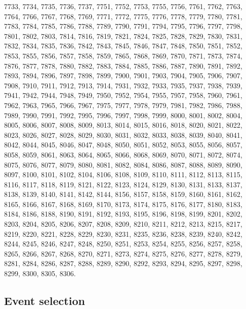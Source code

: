 7733, 7734, 7735, 7736, 7737, 7751, 7752, 7753, 7755, 7756, 7761, 7762, 7763, 7764, 7766, 7767, 7768, 7769, 7771, 7772, 7775, 7776, 7778, 7779, 7780, 7781, 7783, 7784, 7785, 7786, 7788, 7789, 7790, 7791, 7794, 7795, 7796, 7797, 7798, 7801, 7802, 7803, 7814, 7816, 7819, 7821, 7824, 7825, 7828, 7829, 7830, 7831, 7832, 7834, 7835, 7836, 7842, 7843, 7845, 7846, 7847, 7848, 7850, 7851, 7852, 7853, 7855, 7856, 7857, 7858, 7859, 7865, 7868, 7869, 7870, 7871, 7873, 7874, 7876, 7877, 7878, 7880, 7882, 7883, 7884, 7885, 7886, 7887, 7890, 7891, 7892, 7893, 7894, 7896, 7897, 7898, 7899, 7900, 7901, 7903, 7904, 7905, 7906, 7907, 7908, 7910, 7911, 7912, 7913, 7914, 7931, 7932, 7933, 7935, 7937, 7938, 7939, 7941, 7942, 7944, 7948, 7949, 7950, 7952, 7954, 7955, 7957, 7958, 7960, 7961, 7962, 7963, 7965, 7966, 7967, 7975, 7977, 7978, 7979, 7981, 7982, 7986, 7988, 7989, 7990, 7991, 7992, 7995, 7996, 7997, 7998, 7999, 8000, 8001, 8002, 8004, 8005, 8006, 8007, 8008, 8009, 8013, 8014, 8015, 8016, 8018, 8020, 8021, 8022, 8023, 8026, 8027, 8028, 8029, 8030, 8031, 8032, 8033, 8038, 8039, 8040, 8041, 8042, 8044, 8045, 8046, 8047, 8048, 8050, 8051, 8052, 8053, 8055, 8056, 8057, 8058, 8059, 8061, 8063, 8064, 8065, 8066, 8068, 8069, 8070, 8071, 8072, 8074, 8075, 8076, 8077, 8079, 8080, 8081, 8082, 8084, 8086, 8087, 8088, 8089, 8090, 8097, 8100, 8101, 8102, 8104, 8106, 8108, 8109, 8110, 8111, 8112, 8113, 8115, 8116, 8117, 8118, 8119, 8121, 8122, 8123, 8124, 8129, 8130, 8131, 8133, 8137, 8138, 8139, 8140, 8141, 8142, 8144, 8156, 8157, 8158, 8159, 8160, 8161, 8162, 8165, 8166, 8167, 8168, 8169, 8170, 8173, 8174, 8175, 8176, 8177, 8180, 8183, 8184, 8186, 8188, 8190, 8191, 8192, 8193, 8195, 8196, 8198, 8199, 8201, 8202, 8203, 8204, 8205, 8206, 8207, 8208, 8209, 8210, 8211, 8212, 8213, 8215, 8217, 8219, 8220, 8221, 8228, 8229, 8230, 8231, 8235, 8236, 8238, 8239, 8240, 8242, 8244, 8245, 8246, 8247, 8248, 8250, 8251, 8253, 8254, 8255, 8256, 8257, 8258, 8265, 8266, 8267, 8268, 8270, 8271, 8273, 8274, 8275, 8276, 8277, 8278, 8279, 8281, 8284, 8286, 8287, 8288, 8289, 8290, 8292, 8293, 8294, 8295, 8297, 8298, 8299, 8300, 8305, 8306.
    


\subsection{Event selection}



